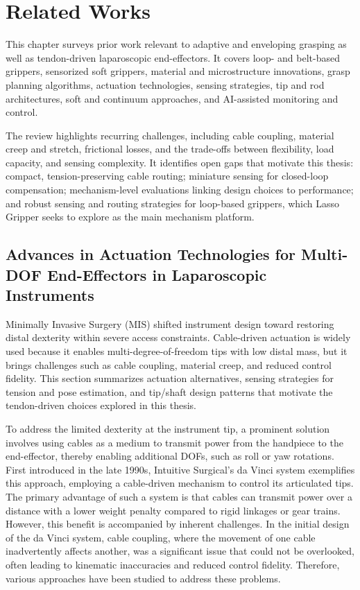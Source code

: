 ﻿\chapter{Related Works}

\begin{chaptersummary}
This chapter surveys prior work relevant to adaptive and enveloping grasping as well as tendon-driven laparoscopic end-effectors. It covers loop- and belt-based grippers, sensorized soft grippers, material and microstructure innovations, grasp planning algorithms, actuation technologies, sensing strategies, tip and rod architectures, soft and continuum approaches, and AI-assisted monitoring and control.

The review highlights recurring challenges, including cable coupling, material creep and stretch, frictional losses, and the trade-offs between flexibility, load capacity, and sensing complexity. It identifies open gaps that motivate this thesis: compact, tension-preserving cable routing; miniature sensing for closed-loop compensation; mechanism-level evaluations linking design choices to performance; and robust sensing and routing strategies for loop-based grippers, which Lasso Gripper seeks to explore as the main mechanism platform.
\end{chaptersummary}

\section{Advances in Actuation Technologies for Multi-DOF End-Effectors in Laparoscopic Instruments}

Minimally Invasive Surgery (MIS) shifted instrument design toward restoring distal dexterity within severe access constraints. Cable-driven actuation is widely used because it enables multi-degree-of-freedom tips with low distal mass, but it brings challenges such as cable coupling, material creep, and reduced control fidelity. This section summarizes actuation alternatives, sensing strategies for tension and pose estimation, and tip/shaft design patterns that motivate the tendon-driven choices explored in this thesis.

To address the limited dexterity at the instrument tip, a prominent solution involves using cables as a medium to transmit power from the handpiece to the end-effector, thereby enabling additional DOFs, such as roll or yaw rotations. First introduced in the late 1990s, Intuitive Surgical's da Vinci system exemplifies this approach, employing a cable-driven mechanism to control its articulated tips. The primary advantage of such a system is that cables can transmit power over a distance with a lower weight penalty compared to rigid linkages or gear trains\cite{brodie_future_2018}. However, this benefit is accompanied by inherent challenges. In the initial design of the da Vinci system, cable coupling, where the movement of one cable inadvertently affects another, was a significant issue that could not be overlooked, often leading to kinematic inaccuracies and reduced control fidelity. Therefore, various approaches have been studied to address these problems.

